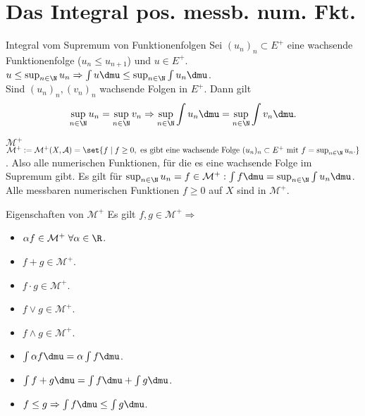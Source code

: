 \section*{Das Integral pos. messb. num. Fkt.}

\begin{karte}{Integral vom Supremum von Funktionenfolgen}
	Sei \( (u_n)_n \subset E^+ \) eine wachsende Funktionenfolge 
	(\(u_n \leq u_{n+1}\)) und \(u \in E^+\).\\
	\( u \leq \sup_{n\in\N} u_n \Rightarrow \int u \dmu 
	\leq \sup_{n\in\N} \int u_n \dmu \).\\
	Sind \( (u_n)_n, (v_n)_n \) wachsende Folgen in \(E^+\). Dann gilt 
	\[ \sup_{n\in\N} u_n = \sup_{n\in\N} v_n \Rightarrow 
	\sup_{n\in\N} \int u_n \dmu = \sup_{n\in\N} \int v_n \dmu. \]
\end{karte}

\begin{karte}{\( \mathcal{M}^+ \)}
	\( \mathcal{M}^+ := \mathcal{M}^+(X, \mathcal{A}) 
	= \set{f \;|\; f \geq 0, \text{ es gibt eine wachsende Folge } (u_n)_n \subset E^+ 
	\text{ mit } f = \sup_{n\in\N} u_n. } \). Also alle numerischen Funktionen, für die es eine wachsende Folge im Supremum gibt.
	Es gilt für \( \sup_{n\in\N} u_n = f\in \mathcal{M}^+: \int f \dmu = \sup_{n\in\N} \int u_n \dmu \).\\
	Alle messbaren numerischen Funktionen \( f \geq 0 \) auf \(X\) sind in \( \mathcal{M}^+ \).
\end{karte}

\begin{karte}{Eigenschaften von \( \mathcal{M}^+ \)}
	Es gilt \( f,g \in \mathcal{M}^+ \Rightarrow \)
	\begin{itemize}
		\item \( \alpha f \in \mathcal{M}^+ \;\forall \alpha \in\R \).
		\item \( f + g \in \mathcal{M}^+ \).
		\item \( f \cdot g \in \mathcal{M}^+ \).
		\item \( f \vee g \in \mathcal{M}^+ \).
		\item \( f \wedge g \in \mathcal{M}^+ \).
		\item \( \int \alpha f \dmu 
		= \alpha \int f \dmu \).
		\item \( \int f+g \dmu 
		= \int f \dmu + \int g \dmu \).
		\item \( f \leq g \Rightarrow 
		\int f \dmu \leq \int g\dmu \).
	\end{itemize}
\end{karte}

